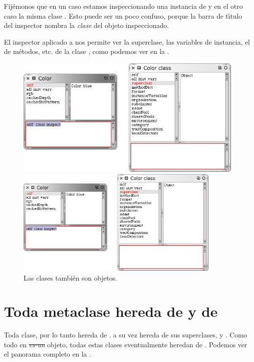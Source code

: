 \documentclass[a4paper,10pt,twoside]{book}
\begin{document}
\noindent
Fij\'emonos que en un caso estamos inspeccionando una instancia de  y en el otro caso la misma clase . Esto puede ser un poco confuso, porque la barra de t\'{\i}tulo del inspector nombra la \emph{clase} del objeto inspeccionado.

El inspector aplicado a  nos permite ver la superclase, las variables de instancia, el  de m\'etodos, etc. de la clase , como podemos ver en la .

\begin{center}
\begin{figure}[!ht]
\ifluluelse
	{\centerline{\includegraphics[width=\textwidth]{InspectingColor}}}
	{\centerline{\includegraphics[width=10cm]{InspectingColor}}}
\caption{Las clases tambi\'en son objetos.}
\end{figure}
\end{center}

\section{Toda metaclase hereda de  y de }

Toda   clase, por lo tanto hereda de .
 a su vez hereda de sus superclases,  y .
Como todo en \st \emph{es-un} objeto, todas estas clases eventualmente heredan de .
Podemos ver el panorama completo en la .
\end{document}
